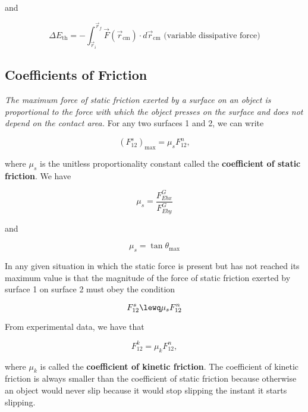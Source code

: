         and

        \[
            \Delta E_{\text{th}} = -\int_{\vec{r}_i}^{\vec{r}_f} \vec{F} \left(\vec{r}_{\text{cm}}\right)\cdot d\vec{r}_{\text{cm}} \text{ (variable dissipative force)}
        \]

\pagebreak

    \subsection{Coefficients of Friction}

        \textit{The maximum force of static friction exerted by a surface on an object is proportional to the force with which the object presses on the surface and does not depend on the contact area.} For any two
        surfaces 1 and 2, we can write

        \[
            \left(F^s_{12}\right)_{\text{max}} = \mu_s F^n_{12},
        \]

        where $\mu_s$ is the unitless proportionality constant called the \textbf{coefficient of static friction}. We have

        \[
            \mu_s = \frac{F^G_{Eb x}}{F^G_{Eb y}}
        \]

        and

        \[
            \mu_s = \tan{\theta_{\text{max}}}
        \]

        In any given situation in which the static force is present but has not reached its maximum value is that the magnitude of the force of static friction exerted by surface 1 on surface 2 must obey the condition

        \[
            F^s_{12} \lewq \mu_s F^n_{12}
        \]

        From experimental data, we have that

        \[
            F^k_{12} = \mu_k F^n_{12},
        \]

        where $\mu_k$ is called the \textbf{coefficient of kinetic friction}. The coefficient of kinetic friction is always smaller than the coefficient of static friction because otherwise an object would never slip
        because it would stop slipping the instant it starts slipping.

